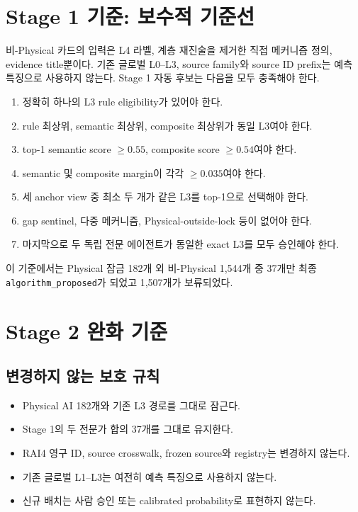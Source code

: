 \documentclass[11pt,a4paper]{article}
\newcommand{\code}[1]{\texttt{#1}}
\begin{document}
\section{Stage 1 기준: 보수적 기준선}

비-Physical 카드의 입력은 L4 라벨, 계층 재진술을 제거한 직접 메커니즘 정의,
evidence title뿐이다. 기존 글로벌 L0--L3, source family와 source ID prefix는
예측 특징으로 사용하지 않는다. Stage 1 자동 후보는 다음을 모두 충족해야 한다.

\begin{enumerate}[leftmargin=2em]
  \item 정확히 하나의 L3 rule eligibility가 있어야 한다.
  \item rule 최상위, semantic 최상위, composite 최상위가 동일 L3여야 한다.
  \item top-1 semantic score $\ge 0.55$, composite score $\ge 0.54$여야 한다.
  \item semantic 및 composite margin이 각각 $\ge 0.035$여야 한다.
  \item 세 anchor view 중 최소 두 개가 같은 L3를 top-1으로 선택해야 한다.
  \item gap sentinel, 다중 메커니즘, Physical-outside-lock 등이 없어야 한다.
  \item 마지막으로 두 독립 전문 에이전트가 동일한 exact L3를 모두 승인해야 한다.
\end{enumerate}

이 기준에서는 Physical 잠금 182개 외 비-Physical 1,544개 중 37개만 최종
\code{algorithm\_proposed}가 되었고 1,507개가 보류되었다.

\section{Stage 2 완화 기준}

\subsection{변경하지 않는 보호 규칙}

\begin{itemize}[leftmargin=2em]
  \item Physical AI 182개와 기존 L3 경로를 그대로 잠근다.
  \item Stage 1의 두 전문가 합의 37개를 그대로 유지한다.
  \item RAI4 영구 ID, source crosswalk, frozen source와 registry는 변경하지 않는다.
  \item 기존 글로벌 L1--L3는 여전히 예측 특징으로 사용하지 않는다.
  \item 신규 배치는 사람 승인 또는 calibrated probability로 표현하지 않는다.
\end{itemize}
\end{document}
